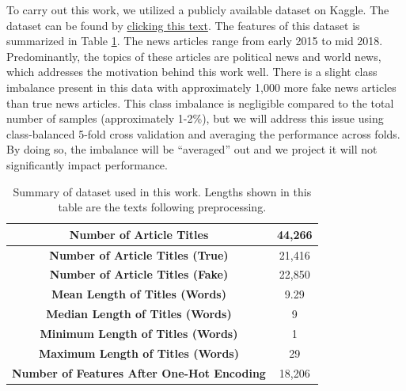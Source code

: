 \documentclass[12pt]{article}
\begin{document}
    To carry out this work, we utilized a publicly available dataset on Kaggle. The dataset can be found by \href{https://www.kaggle.com/clmentbisaillon/fake-and-real-news-dataset}{clicking this text}. The features of this dataset is summarized in Table \ref{table:1}. The news articles range from early 2015 to mid 2018. Predominantly, the topics of these articles are political news and world news, which addresses the motivation behind this work well. There is a slight class imbalance present in this data with approximately 1,000 more fake news articles than true news articles. This class imbalance is negligible compared to the total number of samples (approximately 1-2\%), but we will address this issue using class-balanced 5-fold cross validation and averaging the performance across folds. By doing so, the imbalance will be ``averaged'' out and we project it will not significantly impact performance. 

    \begin{table}
    \begin{center}
        \begin{tabular}{|c|c|}
            \hline
            \textbf{Number of Article Titles}&44,266\\
            \hline
            \textbf{Number of Article Titles (True)}&21,416\\
            \hline
            \textbf{Number of Article Titles (Fake)}&22,850\\
            \hline
            \textbf{Mean Length of Titles (Words)}&9.29\\
            \hline
            \textbf{Median Length of Titles (Words)}&9\\
            \hline
            \textbf{Minimum Length of Titles (Words)}&1\\
            \hline
            \textbf{Maximum Length of Titles (Words)}&29\\
            \hline
            \textbf{Number of Features After One-Hot Encoding}&18,206\\
            \hline
        \end{tabular}
        \caption{Summary of dataset used in this work. Lengths shown in this table are the texts following preprocessing.}
        \label{table:1}
    \end{center}  
    \end{table} 	
    
\end{document}
